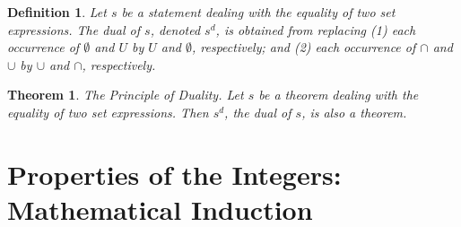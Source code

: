 \documentclass[12pt]{article}
\newtheorem{definition}{Definition} [section]
\newtheorem{theorem}{Theorem} [section]
\begin{document}
\begin{definition}
\emph{Let $s$ be a statement dealing with the equality of two set expressions. The }dual \emph{of $s$, denoted $s^d$, is obtained from replacing (1) each occurrence of $\emptyset$ and $U$ by $U$ and $\emptyset$, respectively; and (2) each occurrence of $\cap$ and $\cup$ by $\cup$ and $\cap$, respectively.}
\end{definition}
\begin{theorem}
The Principle of Duality. \emph{Let $s$ be a theorem dealing with the equality of two set expressions. Then $s^d$, the dual of $s$, is also a theorem.}
\end{theorem}
\section{Properties of the Integers: Mathematical Induction}
\end{document}

